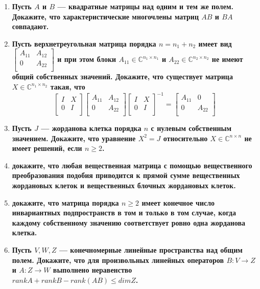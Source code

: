 \documentclass[12pt]{article} %
\begin{document}
\begin{enumerate}
    \item \textbf{Пусть $A$ и $B$ --- квадратные матрицы над одним и тем же полем. Докажите, что характеристические многочлены матриц $AB$ и $BA$ совпадают.}
    \item \textbf{Пусть верхнетреугольная матрица порядка $n = n_1 + n_2$ имеет вид $
    \begin{bmatrix}
        A_{11} & A_{12}\\
        0 & A_{22}\\
    \end{bmatrix}
    $ и при этом блоки $A_{11} \in \mathds{C}^{n_1 \times n_1}$ и $A_{22} \in \mathds{C}^{n_2 \times n_2}$ не имеют общий собственных значений. Докажите, что существует матрица $X \in \mathds{C}^{n_1 \times n_2}$ такая, что
    \[
    \begin{bmatrix}
        I & X\\
        0 & I\\
    \end{bmatrix}
    \begin{bmatrix}
        A_{11} & A_{12}\\
        0 & A_{22}\\
    \end{bmatrix}
    \begin{bmatrix}
        I & X\\
        0 & I\\
    \end{bmatrix}^{-1}
    =
    \begin{bmatrix}
        A_{11} & 0\\
        0 & A_{22}\\
    \end{bmatrix}
    \]
    }
    \item \textbf{Пусть $J$ --- жорданова клетка порядка $n$ с нулевым собственным значением. Докажите, что уравнение $X^2 = J$ относительно $X \in \mathds{C}^{n \times n}$ не имеет решений, если $n \geqslant 2$.}
    \item \textbf{докажите, что любая вещественная матрица с помощью вещественного преобразования подобия приводится к прямой сумме вещественных жордановых клеток и вещественных  блочных жордановых клеток.}
    \item \textbf{докажите, что матрица порядка $n \geqslant 2$ имеет конечное число инвариантных подпространств в том и только в том случае, когда каждому собственному значению соответствует ровно одна жорданова клетка.}
    \item \textbf{ Пусть $V, W ,Z$ --- конечномерные линейные пространства над общим полем. Докажите, что для произвольных линейных операторов $B : V \rightarrow Z$ и $A : Z \rightarrow W$ выполнено неравенство $rankA  + rankB - rank(AB) \leqslant dimZ$.}

\end{enumerate}
\end{document}

